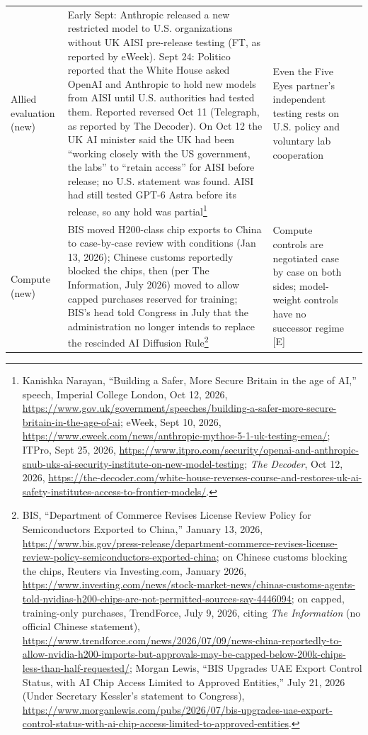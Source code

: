 \documentclass[11pt,letterpaper]{article}
\begin{document}
\begin{center}
\scriptsize
\begin{tabularx}{\linewidth}{ZY{0.44}Y{1.49}Y{1.07}}
Allied evaluation (new) & Early Sept: Anthropic released a new restricted model to U.S. organizations without UK AISI pre-release testing (FT, as reported by eWeek). Sept 24: Politico reported that the White House asked OpenAI and Anthropic to hold new models from AISI until U.S. authorities had tested them. Reported reversed Oct 11 (Telegraph, as reported by The Decoder). On Oct 12 the UK AI minister said the UK had been ``working closely with the US government, the labs'' to ``retain access'' for AISI before release; no U.S. statement was found. AISI had still tested GPT-6 Astra before its release, so any hold was partial\footnote{Kanishka Narayan, ``Building a Safer, More Secure Britain in the age of AI,'' speech, Imperial College London, Oct 12, 2026, \url{https://www.gov.uk/government/speeches/building-a-safer-more-secure-britain-in-the-age-of-ai}; eWeek, Sept 10, 2026, \url{https://www.eweek.com/news/anthropic-mythos-5-1-uk-testing-emea/}; ITPro, Sept 25, 2026, \url{https://www.itpro.com/security/openai-and-anthropic-snub-uks-ai-security-institute-on-new-model-testing}; \textit{The Decoder}, Oct 12, 2026, \url{https://the-decoder.com/white-house-reverses-course-and-restores-uk-ai-safety-institutes-access-to-frontier-models/}.} & Even the Five Eyes partner's independent testing rests on U.S. policy and voluntary lab cooperation \\
Compute (new) & BIS moved H200-class chip exports to China to case-by-case review with conditions (Jan 13, 2026); Chinese customs reportedly blocked the chips, then (per The Information, July 2026) moved to allow capped purchases reserved for training; BIS's head told Congress in July that the administration no longer intends to replace the rescinded AI Diffusion Rule\footnote{\def\UrlBreaks{\do\/\do-}BIS, ``Department of Commerce Revises License Review Policy for Semiconductors Exported to China,'' January 13, 2026, \url{https://www.bis.gov/press-release/department-commerce-revises-license-review-policy-semiconductors-exported-china}; on Chinese customs blocking the chips, Reuters via Investing.com, January 2026, \url{https://www.investing.com/news/stock-market-news/chinas-customs-agents-told-nvidias-h200-chips-are-not-permitted-sources-say-4446094}; on capped, training-only purchases, TrendForce, July 9, 2026, citing \textit{The Information} (no official Chinese statement), \url{https://www.trendforce.com/news/2026/07/09/news-china-reportedly-to-allow-nvidia-h200-imports-but-approvals-may-be-capped-below-200k-chips-less-than-half-requested/}; Morgan Lewis, ``BIS Upgrades UAE Export Control Status, with AI Chip Access Limited to Approved Entities,'' July 21, 2026 (Under Secretary Kessler's statement to Congress), \url{https://www.morganlewis.com/pubs/2026/07/bis-upgrades-uae-export-control-status-with-ai-chip-access-limited-to-approved-entities}.} & Compute controls are negotiated case by case on both sides; model-weight controls have no successor regime [E] \\
\bottomrule
\end{tabularx}
\end{center}
\end{document}
